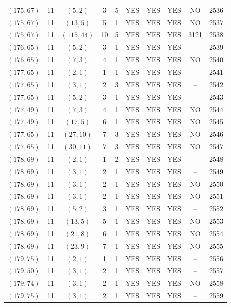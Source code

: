 \begin{longtable}{|c|c|c|c|c|c|c|c|c|c|}
$(175, 67)$ & 11 & $(5, 2)$ & 3 & 5 & YES & YES & YES & NO & 2536\\
$(175, 67)$ & 11 & $(13, 5)$ & 5 & 1 & YES & YES & YES & NO & 2537\\
$(175, 67)$ & 11 & $(115, 44)$ & 10 & 5 & YES & YES & YES & 3121 & 2538\\
$(176, 65)$ & 11 & $(5, 2)$ & 3 & 1 & YES & YES & YES & -- & 2539\\
$(176, 65)$ & 11 & $(7, 3)$ & 4 & 1 & YES & YES & YES & NO & 2540\\
$(177, 65)$ & 11 & $(2, 1)$ & 1 & 1 & YES & YES & YES & -- & 2541\\
$(177, 65)$ & 11 & $(3, 1)$ & 2 & 3 & YES & YES & YES & -- & 2542\\
$(177, 65)$ & 11 & $(5, 2)$ & 3 & 1 & YES & YES & YES & -- & 2543\\
$(177, 49)$ & 11 & $(7, 3)$ & 4 & 1 & YES & YES & YES & NO & 2544\\
$(177, 49)$ & 11 & $(17, 5)$ & 6 & 1 & YES & YES & YES & NO & 2545\\
$(177, 65)$ & 11 & $(27, 10)$ & 7 & 3 & YES & YES & YES & NO & 2546\\
$(177, 65)$ & 11 & $(30, 11)$ & 7 & 3 & YES & YES & YES & NO & 2547\\
$(178, 69)$ & 11 & $(2, 1)$ & 1 & 2 & YES & YES & YES & -- & 2548\\
$(178, 69)$ & 11 & $(3, 1)$ & 2 & 1 & YES & YES & YES & -- & 2549\\
$(178, 69)$ & 11 & $(3, 1)$ & 2 & 1 & YES & YES & YES & NO & 2550\\
$(178, 69)$ & 11 & $(3, 1)$ & 2 & 1 & YES & YES & YES & NO & 2551\\
$(178, 69)$ & 11 & $(5, 2)$ & 3 & 1 & YES & YES & YES & -- & 2552\\
$(178, 69)$ & 11 & $(13, 5)$ & 5 & 1 & YES & YES & YES & NO & 2553\\
$(178, 69)$ & 11 & $(21, 8)$ & 6 & 1 & YES & YES & YES & NO & 2554\\
$(178, 69)$ & 11 & $(23, 9)$ & 7 & 1 & YES & YES & YES & NO & 2555\\
$(179, 75)$ & 11 & $(2, 1)$ & 1 & 1 & YES & YES & YES & -- & 2556\\
$(179, 50)$ & 11 & $(3, 1)$ & 2 & 1 & YES & YES & YES & -- & 2557\\
$(179, 74)$ & 11 & $(3, 1)$ & 2 & 1 & YES & YES & YES & NO & 2558\\
$(179, 75)$ & 11 & $(3, 1)$ & 2 & 1 & YES & YES & YES & -- & 2559\\

\end{longtable}

